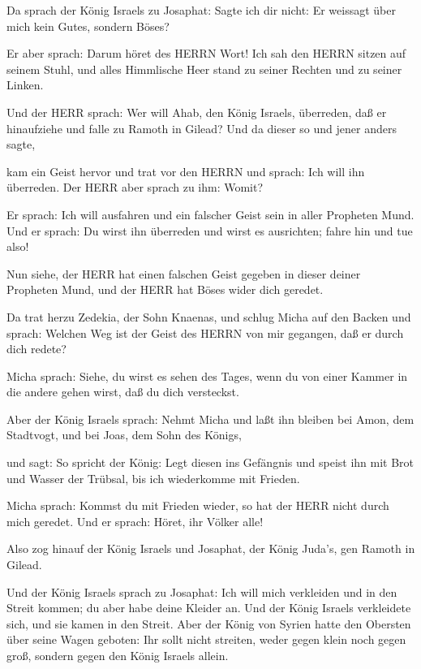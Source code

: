  Da sprach der König Israels zu Josaphat: Sagte ich dir
nicht: Er weissagt über mich kein Gutes, sondern Böses?

 Er aber sprach: Darum höret des HERRN Wort! Ich sah den
HERRN sitzen auf seinem Stuhl, und alles Himmlische Heer stand zu seiner
Rechten und zu seiner Linken.

 Und der HERR sprach: Wer will Ahab, den König Israels,
überreden, daß er hinaufziehe und falle zu Ramoth in Gilead? Und da
dieser so und jener anders sagte,

 kam ein Geist hervor und trat vor den HERRN und sprach:
Ich will ihn überreden. Der HERR aber sprach zu ihm: Womit?

 Er sprach: Ich will ausfahren und ein falscher Geist sein
in aller Propheten Mund. Und er sprach: Du wirst ihn überreden und wirst
es ausrichten; fahre hin und tue also!

 Nun siehe, der HERR hat einen falschen Geist gegeben in
dieser deiner Propheten Mund, und der HERR hat Böses wider dich geredet.

 Da trat herzu Zedekia, der Sohn Knaenas, und schlug Micha
auf den Backen und sprach: Welchen Weg ist der Geist des HERRN von mir
gegangen, daß er durch dich redete?

 Micha sprach: Siehe, du wirst es sehen des Tages, wenn du
von einer Kammer in die andere gehen wirst, daß du dich versteckst.

 Aber der König Israels sprach: Nehmt Micha und laßt ihn
bleiben bei Amon, dem Stadtvogt, und bei Joas, dem Sohn des Königs,

 und sagt: So spricht der König: Legt diesen ins Gefängnis
und speist ihn mit Brot und Wasser der Trübsal, bis ich wiederkomme mit
Frieden.

 Micha sprach: Kommst du mit Frieden wieder, so hat der
HERR nicht durch mich geredet. Und er sprach: Höret, ihr Völker alle!

 Also zog hinauf der König Israels und Josaphat, der König
Juda's, gen Ramoth in Gilead.

 Und der König Israels sprach zu Josaphat: Ich will mich
verkleiden und in den Streit kommen; du aber habe deine Kleider an. Und
der König Israels verkleidete sich, und sie kamen in den Streit.
 Aber der König von Syrien hatte den Obersten über seine
Wagen geboten: Ihr sollt nicht streiten, weder gegen klein noch gegen
groß, sondern gegen den König Israels allein.


